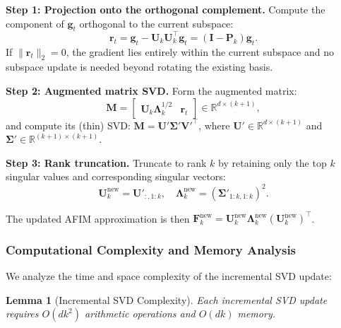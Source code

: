 ﻿\documentclass[lettersize,journal]{IEEEtran}
\newtheorem{lemma}{Lemma}
\begin{document}
\textbf{Step 1: Projection onto the orthogonal complement.} Compute the component of $\mathbf{g}_t$ orthogonal to the current subspace:
\begin{equation}
\label{eq:projection_complement}
\mathbf{r}_t = \mathbf{g}_t - \mathbf{U}_k \mathbf{U}_k^\top \mathbf{g}_t = (\mathbf{I} - \mathbf{P}_k) \mathbf{g}_t.
\end{equation}
If $\|\mathbf{r}_t\|_2 = 0$, the gradient lies entirely within the current subspace and no subspace update is needed beyond rotating the existing basis.

\textbf{Step 2: Augmented matrix SVD.} Form the augmented matrix:
\begin{equation}
\label{eq:augmented_matrix}
\mathbf{M} = \begin{bmatrix} \mathbf{U}_k \boldsymbol{\Lambda}_k^{1/2} & \mathbf{r}_t \end{bmatrix} \in \mathbb{R}^{d \times (k+1)},
\end{equation}
and compute its (thin) SVD: $\mathbf{M} = \mathbf{U}' \boldsymbol{\Sigma}' \mathbf{V}'^\top$, where $\mathbf{U}' \in \mathbb{R}^{d \times (k+1)}$ and $\boldsymbol{\Sigma}' \in \mathbb{R}^{(k+1) \times (k+1)}$.

\textbf{Step 3: Rank truncation.} Truncate to rank $k$ by retaining only the top $k$ singular values and corresponding singular vectors:
\begin{equation}
\label{eq:truncation}
\mathbf{U}_k^{\text{new}} = \mathbf{U}'_{:, 1:k}, \quad \boldsymbol{\Lambda}_k^{\text{new}} = (\boldsymbol{\Sigma}'_{1:k, 1:k})^2.
\end{equation}

The updated AFIM approximation is then $\mathbf{F}_k^{\text{new}} = \mathbf{U}_k^{\text{new}} \boldsymbol{\Lambda}_k^{\text{new}} (\mathbf{U}_k^{\text{new}})^\top$.

\subsubsection{Computational Complexity and Memory Analysis}
\label{sec:complexity}

We analyze the time and space complexity of the incremental SVD update:

\begin{lemma}[Incremental SVD Complexity]
\label{lem:incsvd_complexity}
Each incremental SVD update requires $O(dk^2)$ arithmetic operations and $O(dk)$ memory.
\end{lemma}
\end{document}
